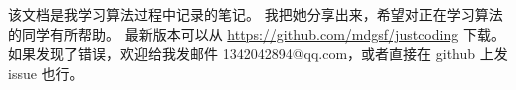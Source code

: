 该文档是我学习算法过程中记录的笔记。
我把她分享出来，希望对正在学习算法的同学有所帮助。
最新版本可以从 \href{https://github.com/mdgsf/justcoding}{https://github.com/mdgsf/justcoding} 下载。
如果发现了错误，欢迎给我发邮件 1342042894@qq.com，或者直接在 github 上发 issue 也行。
